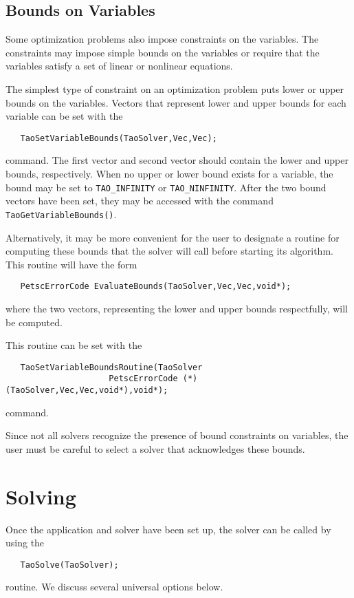 \subsection{Bounds on Variables}\label{sec:bounds}

Some optimization problems also impose constraints on the variables.
The constraints may impose simple bounds on the variables or
require that the variables satisfy a set of linear or  nonlinear equations.

The simplest type of constraint on an optimization problem puts lower
or upper bounds on the variables. 
Vectors that represent lower and upper bounds for each variable 
can be set with the   
\begin{verbatim}
   TaoSetVariableBounds(TaoSolver,Vec,Vec);
\end{verbatim}
command. 
The first vector and second vector should contain the lower and upper 
bounds, respectively.
When no upper or lower bound exists for a variable, the bound
may be set to {\tt TAO\_INFINITY} or {\tt TAO\_NINFINITY}.
After the two bound vectors have been set, they may be accessed
with the command  {\tt TaoGetVariableBounds()}.

Alternatively, it may be more convenient for the user to designate a routine 
for computing these bounds
that the solver will call before starting its algorithm.  This routine will
have the form
\begin{verbatim}
   PetscErrorCode EvaluateBounds(TaoSolver,Vec,Vec,void*);
\end{verbatim}
where the two vectors, representing the lower and upper bounds respectfully, 
will be computed.

This routine can be set with the 
\begin{verbatim}
   TaoSetVariableBoundsRoutine(TaoSolver
                     PetscErrorCode (*)(TaoSolver,Vec,Vec,void*),void*);
\end{verbatim}
command.
   
Since not all solvers recognize the presence of bound constraints on 
variables, the user must be careful 
to select a solver that acknowledges these bounds.


\section{Solving}
Once the application and solver have been set up, the solver can be 
 called by using the 
\begin{verbatim}
   TaoSolve(TaoSolver);
\end{verbatim}
routine.
We discuss several universal options below. 

